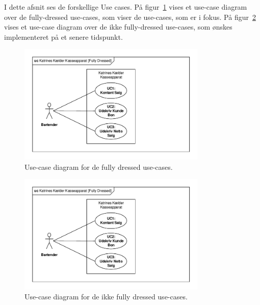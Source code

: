 I dette afsnit ses de forskellige Use cases. På figur~\ref{fig:fullydressedusecases} vises et use-case diagram over de fully-dressed use-cases, som viser de use-cases, som er i fokus. På figur~\ref{fig:ikkefullydressedusecases} vises et use-case diagram over de ikke fully-dressed use-cases, som ønskes implementeret på et senere tidspunkt. 
\begin{figure}
	\centering
	\includegraphics[width=0.8\textwidth, trim=5mm 5mm 5mm 5mm, clip, page=1]{Kravspecifikation/UseCases/Use-cases.pdf}
	\caption{Use-case diagram for de fully dressed use-cases.}
	\label{fig:fullydressedusecases}
\end{figure}

\begin{figure}
	\centering
	\includegraphics[width=0.8\textwidth, trim=5mm 5mm 5mm 5mm, clip, page=2]{Kravspecifikation/UseCases/Use-cases.pdf}
	\caption{Use-case diagram for de ikke fully dressed use-cases.}
	\label{fig:ikkefullydressedusecases}
\end{figure}
\newpage